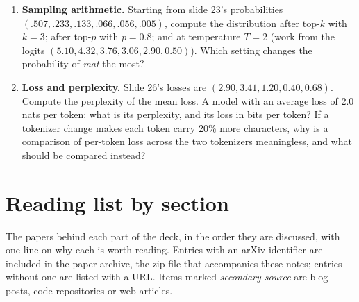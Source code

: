 \documentclass[11pt,letterpaper]{article}
\begin{document}
\begin{enumerate}[leftmargin=1.6em,itemsep=6pt]
\item \textbf{Sampling arithmetic.} Starting from slide 23's probabilities $(.507,.233,.133,.066,.056,.005)$, compute the distribution after top-$k$ with $k=3$; after top-$p$ with $p=0.8$; and at temperature $T=2$ (work from the logits $(5.10,4.32,3.76,3.06,2.90,0.50)$). Which setting changes the probability of \emph{mat} the most?
\item \textbf{Loss and perplexity.} Slide 26's losses are $(2.90,3.41,1.20,0.40,0.68)$. Compute the perplexity of the mean loss. A model with an average loss of 2.0 nats per token: what is its perplexity, and its loss in bits per token? If a tokenizer change makes each token carry 20\% more characters, why is a comparison of per-token loss across the two tokenizers meaningless, and what should be compared instead?
\end{enumerate}

\clearpage
\section{Reading list by section}
\label{app:reading}
The papers behind each part of the deck, in the order they are discussed, with one line on why each is worth reading. Entries with an arXiv identifier are included in the paper archive, the zip file that accompanies these notes; entries without one are listed with a URL. Items marked \emph{secondary source} are blog posts, code repositories or web articles.
\end{document}
